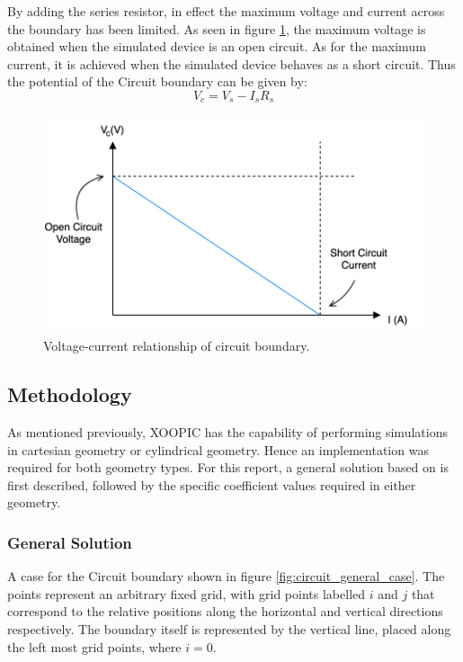 By adding the series resistor, in effect the maximum voltage and current across the boundary has been limited. As seen in figure \ref{fig:circuit_vi_graph}, the maximum voltage is obtained when the simulated device is an open circuit. As for the maximum current, it is achieved when the simulated device behaves as a short circuit. Thus the potential of the Circuit boundary can be given by:
\begin{equation}
	V_c = V_s - I_s R_s	
	\label{eq:circuit_equation}
\end{equation}

\begin{figure}[h!]
	\centering
	\includegraphics[width=0.8\linewidth]{xoopic/figures/circuit_vi_graph.png}
	\caption{Voltage-current relationship of circuit boundary.}
	\label{fig:circuit_vi_graph}
\end{figure} 

\subsection{Methodology}

As mentioned previously, XOOPIC has the capability of performing simulations in cartesian geometry or cylindrical geometry. Hence an implementation was required for both geometry types. For this report, a general solution based on \cite{Verboncoeur1993, Vahedi1997} is first described, followed by the specific coefficient values required in either geometry.

\subsubsection{General Solution}

A case for the Circuit boundary shown in figure \ref{fig:circuit_general_case}. The points represent an arbitrary fixed grid, with grid points labelled $i$ and $j$ that correspond to the relative positions along the horizontal and vertical directions respectively. The boundary itself is represented by the vertical line, placed along the left most grid points, where $i=0$. 

